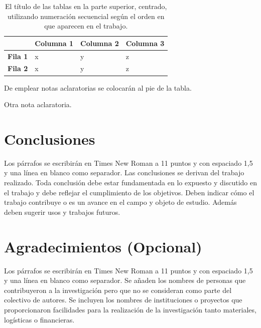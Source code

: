 \documentclass{innosoft}
\begin{document}
\begin{table}[!ht]
\centering
\caption{El t\'itulo de las tablas en la parte superior, centrado, utilizando 
numeraci\'on secuencial seg\'un el orden en que aparecen en el trabajo.}
\label{tab:actions_classification} 
\begin{threeparttable}[b]
\begin{tabular}{|p{4cm}|p{4cm}|p{4cm}|p{4cm}|}
	\hline 
	\textbf{} & \textbf{Columna 1} & \textbf{Columna 2} & \textbf{Columna 
3}\\
	\hline 
	\textbf{Fila 1} & x\tnote{a}  & y & z\\
	\hline 
	\textbf{Fila 2} & x  & y & z\tnote{b}\\
	\hline
\end{tabular}
\begin{tablenotes}
\item [a] De emplear notas aclaratorias se colocar\'an al pie de la tabla.\\
\item [b] Otra nota aclaratoria.
\end{tablenotes}
\end{threeparttable}
\end{table}



\section*{Conclusiones}

Los p\'arrafos se escribir\'an en Times New Roman a 11 puntos y con espaciado 1,5 y una l\'inea en blanco como separador. Las conclusiones se derivan del trabajo realizado. Toda conclusi\'on debe estar fundamentada en lo expuesto y discutido en el trabajo y debe reflejar el cumplimiento de los objetivos. Deben indicar c\'omo el trabajo contribuye o es un avance en el campo y objeto de estudio. Adem\'as deben sugerir usos y trabajos futuros.


\section*{Agradecimientos (Opcional)}
Los p\'arrafos se escribir\'an en Times New Roman a 11 puntos y con espaciado 1,5 y una l\'inea en blanco como separador. Se a\~naden los nombres de personas que contribuyeron a la investigaci\'on pero que no se consideran como parte del colectivo de autores. Se incluyen los nombres de instituciones o proyectos que proporcionaron facilidades para la realizaci\'on de la investigaci\'on tanto materiales, log\'isticas o financieras.
\end{document}
